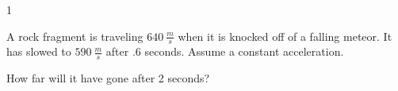 
\AddToShipoutPicture*{\BackgroundPic}

\addtocounter {ProbNum} {1}

 
{\bf \Large{}} A rock fragment is traveling ${640~\tfrac{m}{s}}$  when it is knocked off of a falling meteor. It has slowed to ${590~\tfrac{m}{s}}$  after .6 seconds.  Assume a constant acceleration. 

\bigskip
How far will it have gone after 2 seconds? 



\vfill
\newpage
